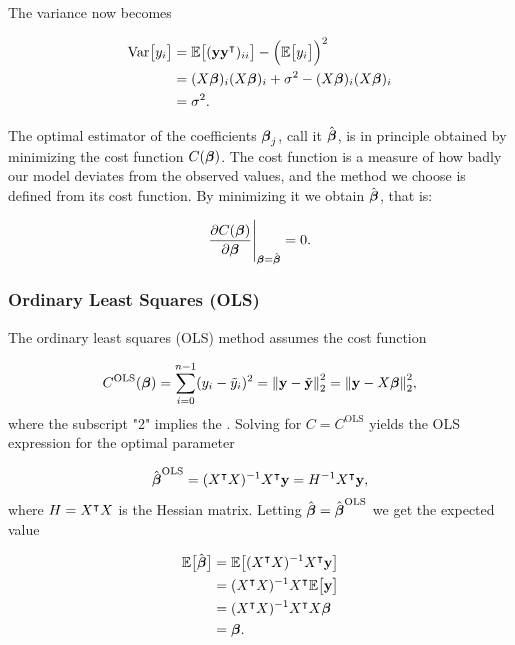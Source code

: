 The variance now becomes

\begin{align*}
    \text{Var}\big[y_i\big] &= \mathbb{E}\big[(\mathbf{y}\mathbf{y}^\intercal)_{ii}\big] -\Big(\mathbb{E}\big[y_i\big]\Big)^2\\
    &= (X\boldsymbol{\beta})_{i} (X\boldsymbol{\beta})_{i} + \sigma^2 - (X\boldsymbol{\beta})_{i} (X\boldsymbol{\beta})_{i}\\
    &= \sigma^2.
\end{align*}


The optimal estimator of the coefficients $\boldsymbol{\beta}_j$, call it $\hat{\boldsymbol{\beta}}$, is in principle obtained by minimizing the cost function $C(\boldsymbol{\beta})$. The cost function is a measure of how badly our model deviates from the observed values, and the method we choose is defined from its cost function. By minimizing it we obtain $\hat{\boldsymbol{\beta}}$, that is:

\begin{align}
    \pdv{C(\boldsymbol{\beta})}{\boldsymbol{\beta}}\Bigg|_{\boldsymbol{\beta}=\hat{\boldsymbol{\beta}}} = 0.
    \label{eq:general_LS}
\end{align}




\subsubsection{Ordinary Least Squares (OLS)}\label{sec:OLS}

The ordinary least squares (OLS) method assumes the cost function

\begin{align*}
    C^\text{OLS}(\boldsymbol{\beta}) = \sum_{i=0}^{n-1}(y_i - \tilde{y}_i)^2 =  \norm{\mathbf{y}-\tilde{\mathbf{y}}}_2^{2} = \norm{\mathbf{y}-X\boldsymbol{\beta}}_2^{2},
\end{align*}
where the subscript "2" implies the \footnotemark. Solving  for $C=C^\text{OLS}$ yields the OLS expression for the optimal parameter

\begin{align}\label{eq:optimal_beta_ols}
    \hat{\boldsymbol{\beta}}^\text{OLS} = (X^\intercal X)^{-1} X^\intercal \mathbf{y} = H^{-1} X^\intercal \mathbf{y},
\end{align}
where $H = X^\intercal X$ is the Hessian matrix.
Letting $\hat{\boldsymbol{\beta}} = \hat{\boldsymbol{\beta}}^\text{OLS}$ we get the expected value 

\begin{align*}
    \mathbb{E}\big[\hat{\boldsymbol{\beta}}\big] &= \mathbb{E}\big[(X^\intercal X)^{-1} X^\intercal \mathbf{y}\big] \\
    &= (X^\intercal X)^{-1} X^\intercal \mathbb{E}\big[\mathbf{y}\big] \\
    &= (X^\intercal X)^{-1} X^\intercal X \boldsymbol{\beta} \\
    &= \boldsymbol{\beta}.
\end{align*}


